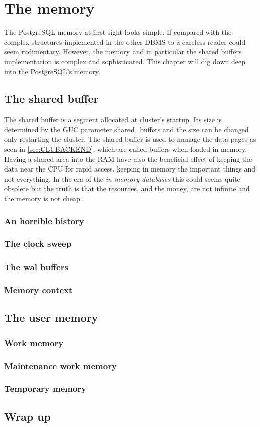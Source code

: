 \chapter{The memory}
\label{ch:PGMEMORY}
The PostgreSQL memory at first sight looks simple. If compared with the complex structures implemented in 
the other DBMS to a careless reader could seem rudimentary. However, the memory and in particular the 
shared buffers implementation is complex and sophisticated. This chapter will dig down deep into the 
PostgreSQL's memory.

\section{The shared buffer}
The shared buffer is a segment allocated at cluster's startup. Its size is determined by the GUC parameter 
shared\_buffers and the size can be changed only restarting the cluster. The shared buffer is used 
to manage the data pages as seen in \ref{sec:CLUBACKEND}, which are called buffers when loaded in memory. 
Having a shared area into the RAM have also the beneficial effect of keeping the data near the CPU for 
rapid access, keeping in memory the important things and not everything. In the era of the \textit{in 
memory databases} this could seems quite obsolete but the truth is that the resources, and the money, are 
not infinite and the memory is not cheap.

\subsection{An horrible history}
\subsection{The clock sweep}
\subsection{The wal buffers}
\subsection{Memory context}

\section{The user memory}
\subsection{Work memory}
\subsection{Maintenance work memory}
\subsection{Temporary memory}

\section{Wrap up}